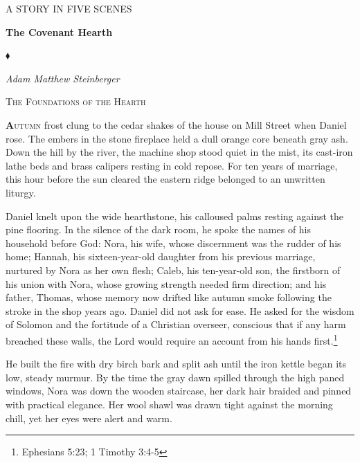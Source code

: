 \documentclass[11pt]{article}
\begin{document}
\begin{titlepage}
    \centering
    \vspace*{1.5in}
    {\scshape\footnotesize A STORY IN FIVE SCENES\par}
    \vspace{0.8in}
    {\Huge\textbf{The Covenant Hearth}\par}
    \vspace{0.3in}
    {\normalsize $\blacklozenge$\par}
    \vspace{0.4in}
    {\itshape\large Adam Matthew Steinberger\par}
    \vfill
\end{titlepage}

\newpage
\setcounter{page}{2}

\begin{center}
    {\scshape\large The Foundations of the Hearth}\par
    \vspace{0.2in}
\end{center}

\lettrine[lines=3,findent=1.5pt,nindent=0pt]{\textbf{A}}{utumn} frost clung to the cedar shakes of the house on Mill Street when Daniel rose. The embers in the stone fireplace held a dull orange core beneath gray ash. Down the hill by the river, the machine shop stood quiet in the mist, its cast-iron lathe beds and brass calipers resting in cold repose. For ten years of marriage, this hour before the sun cleared the eastern ridge belonged to an unwritten liturgy.

Daniel knelt upon the wide hearthstone, his calloused palms resting against the pine flooring. In the silence of the dark room, he spoke the names of his household before God: Nora, his wife, whose discernment was the rudder of his home; Hannah, his sixteen-year-old daughter from his previous marriage, nurtured by Nora as her own flesh; Caleb, his ten-year-old son, the firstborn of his union with Nora, whose growing strength needed firm direction; and his father, Thomas, whose memory now drifted like autumn smoke following the stroke in the shop years ago. Daniel did not ask for ease. He asked for the wisdom of Solomon and the fortitude of a Christian overseer, conscious that if any harm breached these walls, the Lord would require an account from his hands first.\footnote{Ephesians 5:23; 1 Timothy 3:4-5}

He built the fire with dry birch bark and split ash until the iron kettle began its low, steady murmur. By the time the gray dawn spilled through the high paned windows, Nora was down the wooden staircase, her dark hair braided and pinned with practical elegance. Her wool shawl was drawn tight against the morning chill, yet her eyes were alert and warm.
\end{document}
